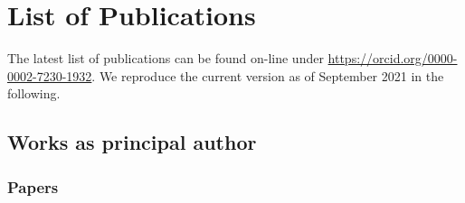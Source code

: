 %
%

\chapter{List of Publications}
The latest list of publications can be found on-line under \url{https://orcid.org/0000-0002-7230-1932}. 
We reproduce the current version as of September 2021 in the following.


\section{Works as principal author}
\subsection*{Papers}
